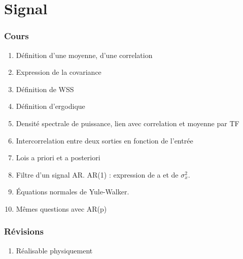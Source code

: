 \documentclass[11pt, twocolumn, landscape]{article}
\begin{document}

\part{Signal}
\section{Cours}
\begin{enumerate}
\item Définition d'une moyenne, d'une correlation
\item Expression de la covariance
\item Définition de WSS
\item Définition d'ergodique
\item Densité spectrale de puissance, lien avec correlation et moyenne par TF
\item Intercorrelation entre deux sorties en fonction de l'entrée
\item Lois a priori et a posteriori
\item Filtre d'un signal AR. AR(1) : expression de a et de $\sigma_x^2$.
\item Équations normales de Yule-Walker. 
\item Mêmes questions avec AR(p)
\end{enumerate}
\section{Révisions}
\begin{enumerate}
\item Réalisable physiquement
\end{enumerate}
\end{document}
